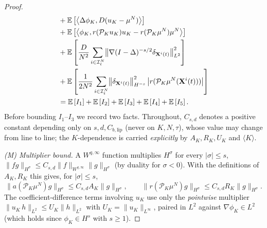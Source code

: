 \documentclass[a4paper,fleqn]{cas-sc}
\theoremstyle{definition}
\theoremstyle{remark}
\begin{document}
\begin{proof}
\begin{equation}
\begin{aligned}
  & +  \mathbb E \left[\left\langle \Delta  \phi_K , D (u_K - \mu^N) \right\rangle \right] \\
  & + \mathbb E \left[\left\langle   \phi_K , r(\mathcal P_K u_K)u_K - r(\mathcal P_K \mu^N)\mu^N \right\rangle \right]  \\
  & +  \mathbb E \left[\frac{D}{N^2} \sum_{i\in \mathcal I^N_t}  \bigl\|\nabla (I-\Delta)^{-s/2}\delta_{\mathbf{X}^i(t)}\bigr\|_{L^2}^2 \right] \\
  & + \mathbb E \left[\frac{1}{2N^2} \sum_{i\in \mathcal I^N_t} \bigl\|\delta_{\mathbf{X}^i(t)}\bigr\|_{H^{-s}}^2 \left|r(\mathcal{P}_K \mu^N(\mathbf{X}^i(t)))\right|\right]\\
  & = \mathbb E \left[I_1\right]+\mathbb E \left[I_2\right]+\mathbb E \left[I_3\right]+\mathbb E \left[I_4\right]+
  \mathbb E \left[I_5\right].
 \end{aligned}
\end{equation}
Before bounding $I_1$--$I_3$ we record two facts. Throughout, $C_{s,d}$ denotes a
positive constant depending only on $s,d,C_{b,\mathrm{lip}}$ (never on $K,N,\tau$), whose
value may change from line to line; the $K$-dependence is carried \emph{explicitly} by
$A_K,R_K,U_K$ and $\langle K\rangle$.

\emph{(M) Multiplier bound.} A $W^{q,\infty}$ function multiplies
$H^\sigma$ for every $|\sigma|\le s$,
$\|fg\|_{H^\sigma}\le C_{s,d}\|f\|_{W^{q,\infty}}\|g\|_{H^\sigma}$
(by duality for $\sigma<0$). With the definitions of $A_K,R_K$ this gives, for
$|\sigma|\le s$,
\[
\|a(\mathcal P_K\mu^N)g\|_{H^\sigma}\le C_{s,d}A_K\|g\|_{H^\sigma},
\qquad
\|r(\mathcal P_K\mu^N)g\|_{H^\sigma}\le C_{s,d}R_K\|g\|_{H^\sigma}.
\]
The coefficient-difference terms involving $u_K$ use only the
\emph{pointwise} multiplier $\|u_K\,h\|_{L^2}\le U_K\|h\|_{L^2}$ with
$U_K=\|u_K\|_{L^\infty}$, paired in $L^2$ against $\nabla\phi_K\in L^2$
(which holds since $\phi_K\in H^s$ with $s\ge1$).


\end{proof}
\end{document}
